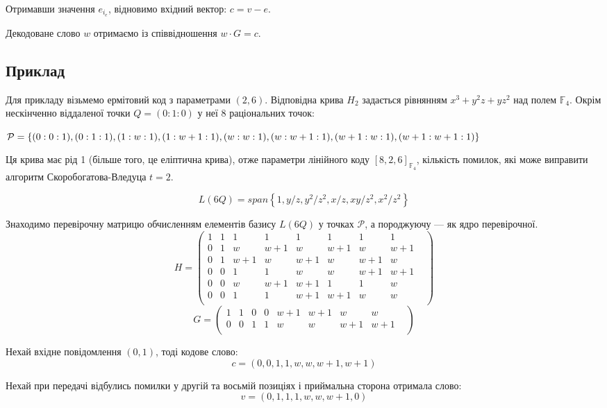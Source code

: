 \documentclass[a4paper,12pt,oneside]{article}
\begin{document}
Отримавши значення $e_{i_e}$, відновимо вхідний вектор: $c = v - e$.

Декодоване слово $w$ отримаємо із співвідношення $w \cdot G = c$.



\subsection{Приклад}
Для прикладу візьмемо ермітовий код з параметрами $(2,6)$. Відповідна крива $H_2$ задається рівнянням $x^3 + y^2 z + y z^2$ над полем $\mathbb{F}_4$. 
Окрім нескінченно віддаленої точки $Q = (0 : 1 : 0)$ у неї 8 раціональних точок:

$\mathcal{P} = \{ (0 : 0 : 1), (0 : 1 : 1), (1 : w : 1), (1 : w + 1 : 1), (w : w : 1), \\
 (w : w + 1 : 1), (w + 1 : w : 1), (w + 1 : w + 1 : 1)\}$

Ця крива має рід 1 (більше того, це еліптична крива), отже параметри лінійного коду $[8, 2, 6]_{\mathbb{F}_4}$, кількість помилок, які може виправити 
алгоритм Скоробогатова-Вледуца $t=2$.

$$L(6Q) = span \left \{ 1, y/z, y^2/z^2, x/z, xy/z^2, x^2/z^2 \right \}$$

Знаходимо перевірочну матрицю обчисленням елементів базису $L(6Q)$ у точках $\mathcal{P}$, а породжуючу --- як ядро перевірочної.
$$
H = 
\begin{pmatrix}
    1 & 1 & 1 & 1 & 1 & 1 & 1 & 1 & \\
    0 & 1 & w & w + 1 & w & w + 1 & w & w + 1 & \\
    0 & 1 & w + 1 & w & w + 1 & w & w + 1 & w & \\
    0 & 0 & 1 & 1 & w & w & w + 1 & w + 1 & \\
    0 & 0 & w & w + 1 & w + 1 & 1 & 1 & w & \\
    0 & 0 & 1 & 1 & w + 1 & w + 1 & w & w & \\
\end{pmatrix}
$$
$$
G = 
\begin{pmatrix}
    1 & 1 & 0 & 0 & w + 1 & w + 1 & w & w & \\
    0 & 0 & 1 & 1 & w & w & w + 1 & w + 1 & \\
\end{pmatrix}
$$

Нехай вхідне повідомлення $(0,1)$, тоді кодове слово:
$$c=(0, 0, 1, 1, w, w, w + 1, w + 1)$$

Нехай при передачі відбулись помилки у другій та восьмій позиціях і приймальна сторона отримала слово:
$$v=(0, 1, 1, 1, w, w, w + 1, 0)$$
\end{document}
